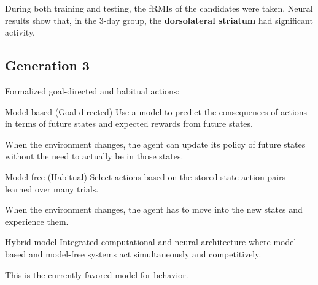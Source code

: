 \begin{casestudy}
    During both training and testing, the fRMIs of the candidates were taken.
    Neural results show that, in the 3-day group, the \textbf{dorsolateral striatum} had significant activity.
\end{casestudy}


\subsection{Generation 3} \label{sec:instrumental_gen3}

Formalized goal-directed and habitual actions:

\begin{descriptionlist}
    \item[Model-based] (Goal-directed) 
        Use a model to predict the consequences of actions in terms of future states and expected rewards from future states.
    
        When the environment changes, the agent can update its policy of future states without the need to actually be in those states.

    \item[Model-free] (Habitual) 
        Select actions based on the stored state-action pairs learned over many trials.

        When the environment changes, the agent has to move into the new states and experience them.

    \item[Hybrid model] 
        Integrated computational and neural architecture where 
        model-based and model-free systems act simultaneously and competitively.

        This is the currently favored model for behavior.
\end{descriptionlist}


